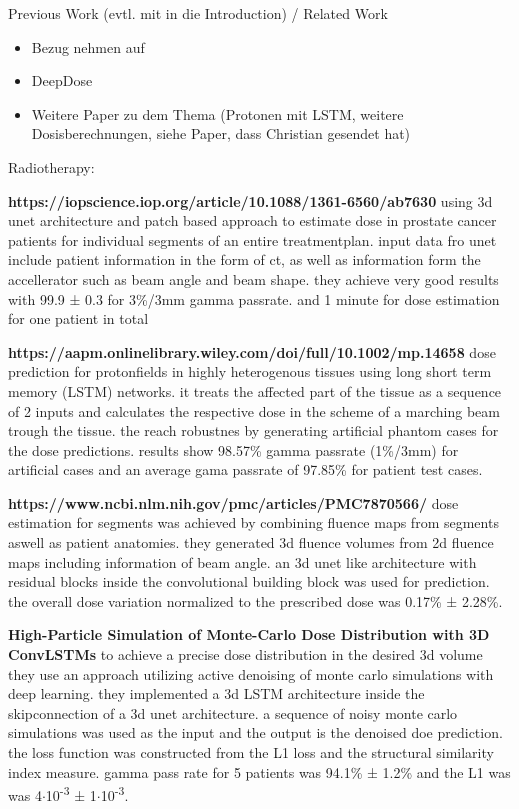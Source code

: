 Previous Work (evtl. mit in die Introduction) / Related Work

\begin{itemize}
\item Bezug nehmen auf
\item DeepDose
\item Weitere Paper zu dem Thema (Protonen mit LSTM, weitere Dosisberechnungen, siehe Paper, dass Christian gesendet hat)
\end{itemize}

Radiotherapy: 

\textbf{https://iopscience.iop.org/article/10.1088/1361-6560/ab7630}\break
using 3d unet architecture and patch based approach to estimate dose in prostate cancer patients for individual segments of an entire treatmentplan. input data fro unet include patient information in the form of ct, as well as information form the accellerator such as beam angle and beam shape. they achieve very good results with 99.9 ± 0.3 for 3\%/3mm gamma passrate. and 1 minute for dose estimation for one patient in total

\textbf{https://aapm.onlinelibrary.wiley.com/doi/full/10.1002/mp.14658}\break
dose prediction for protonfields in highly heterogenous tissues using long short term memory (LSTM) networks. it treats the affected part of the tissue as a sequence of 2 inputs and calculates the respective dose in the scheme of a marching beam trough the tissue. the reach robustnes by generating artificial phantom cases for the dose predictions. results show 98.57\% gamma passrate (1\%/3mm) for artificial cases and an average gama passrate of 97.85\% for patient test cases.

\textbf{https://www.ncbi.nlm.nih.gov/pmc/articles/PMC7870566/}\break
dose estimation for segments was achieved by combining fluence maps from segments aswell as patient anatomies. they generated 3d fluence volumes from 2d fluence maps including information of beam angle. an 3d unet like architecture with residual blocks inside the convolutional building block was used for prediction. the overall dose variation normalized to the prescribed dose was 0.17\% ± 2.28\%. 

\textbf{High-Particle Simulation of Monte-Carlo Dose Distribution with 3D ConvLSTMs}\break
to achieve a precise dose distribution in the desired 3d volume they use an approach utilizing active denoising of monte carlo simulations with deep learning. they implemented a 3d LSTM architecture inside the skipconnection of a 3d unet architecture. a sequence of noisy monte carlo simulations was used as the input and the output is the denoised doe prediction. the loss function was constructed from the L1 loss and the structural similarity index measure. gamma pass rate for 5 patients was 94.1\% ± 1.2\% and the L1 was was 4$\cdot$10\textsuperscript{-3} ± 1$\cdot$10\textsuperscript{-3}.

